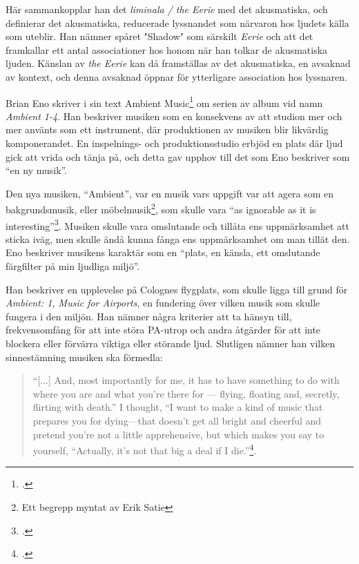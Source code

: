 \documentclass{article}
\begin{document}
Här sammankopplar han det \emph{liminala / the Eerie} med det akusmatiska, och definierar det akusmatiska,
reducerade lyssnandet som närvaron hos ljudets källa som uteblir. Han nämner spåret "Shadow" som särskilt
\emph{Eerie} och att det framkallar ett antal associationer hos honom när han tolkar de akusmatiska ljuden.
Känslan av \emph{the Eerie} kan då framställas av det akusmatiska, en avsaknad av kontext, och denna avsaknad
öppnar för ytterligare association hos lyssnaren.

Brian Eno skriver i sin text Ambient Music\footcite[149-153]{Eno} om serien av album vid namn \emph{Ambient 1-4}. Han
beskriver musiken som en konsekvens av att studion mer och mer använts som ett instrument, där
produktionen av musiken blir likvärdig komponerandet. En inspelnings- och produktionsstudio erbjöd en plats
där ljud gick att vrida och tänja på, och detta gav upphov till det som Eno beskriver som ``en ny musik''.

Den nya musiken, ``Ambient'', var en musik vars uppgift var att agera som en bakgrundsmusik, eller
möbelmusik\footnote{Ett begrepp myntat av Erik Satie}, som skulle vara ``as ignorable as it is
interesting''\footcite{Airports}. Musiken skulle vara omslutande och tillåta ens uppmärksamhet att sticka
iväg, men skulle ändå kunna fånga ens uppmärksamhet om man tillät den.
Eno beskriver musikens karaktär som en ``plats, en känsla, ett omslutande färgfilter på min ljudliga miljö''. 

Han beskriver en upplevelse på Colognes flygplats, som skulle ligga till grund för \emph{Ambient: 1, Music for
Airports}, en fundering över vilken musik som skulle fungera i den miljön. Han nämner några kriterier att ta
hänsyn till, frekvensomfång för att inte störa PA-utrop och andra åtgärder för att inte blockera eller
förvärra viktiga eller störande ljud. Slutligen nämner han vilken sinnestämning musiken ska förmedla:

\begin{quote}
``[...] And, most importantly for me, it has to have
something to do with where you are and what you’re there for — flying, floating and, secretly, flirting with
death.'' I thought, ``I want to make a kind of music that prepares you for dying—that doesn’t get all bright and
cheerful and pretend you’re not a little apprehensive, but which makes you say to yourself, ``Actually, it’s
not that big a deal if I die.''\footcite[152]{Eno}.
\end{quote}
\end{document}
